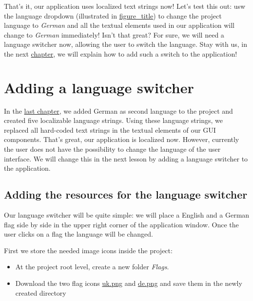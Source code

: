 \documentclass[
  a4paper,
,tablecaptionabove
]{scrbook}
\begin{document}
That's it, our application uses localized text strings now! Let's test
this out: usw the language dropdown (illustrated in
\protect\hyperlink{fig:DropdownLanguages}{figure\_title}) to change the
project language to \emph{German} and all the textual elements used in
our application will change to \emph{German} immediately! Isn't that
great? For sure, we will need a language switcher now, allowing the user
to switch the language. Stay with us, in the next
\href{:LanguageSwitcher.xml}{chapter}, we will explain how to add such a
switch to the application!

\chapter{Adding a language switcher}


In the \href{:LocalizingYourApplication.xml}{last chapter}, we added
German as second language to the project and created five localizable
language strings. Using these language strings, we replaced all
hard-coded text strings in the textual elements of our GUI components.
That's great, our application is localized now. However, currently the
user does not have the possibility to change the language of the user
interface. We will change this in the next lesson by adding a language
switcher to the application.


\hypertarget{_adding_the_resources_for_the_language_switcher}{%
\section{Adding the resources for the language
switcher}\label{_adding_the_resources_for_the_language_switcher}}

Our language switcher will be quite simple: we will place a English and
a German flag side by side in the upper right corner of the application
window. Once the user clicks on a flag the language will be changed.

First we store the needed image icons inside the project:

\begin{itemize}
\item
  At the project root level, create a new folder \emph{Flags}.
\item
  Download the two flag icons
  \href{\%7Battachmentsdir\%7D/flags/uk.png}{uk.png} and
  \href{\%7Battachmentsdir\%7D/flags/de.png}{de.png} and save them in
  the newly created directory
\end{itemize}
\end{document}
